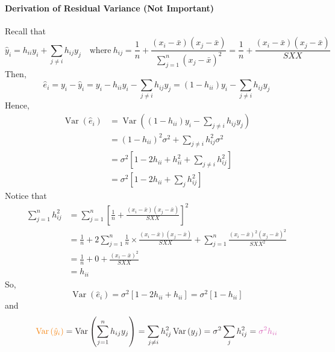 \documentclass[10pt]{article}
\begin{document}
\paragraph{Derivation of Residual Variance (Not Important)}
Recall that
\begin{equation*}
    \hat{y}_{i}=h_{i i} y_{i}+\sum_{j \neq i} h_{i j} y_{j} \quad \text{where}~h_{i j}=\frac{1}{n}+\frac{\left(x_{i}-\bar{x}\right)\left(x_{j}-\bar{x}\right)}{\sum_{j=1}^{n}\left(x_{j}-\bar{x}\right)^{2}}=\frac{1}{n}+\frac{\left(x_{i}-\bar{x}\right)\left(x_{j}-\bar{x}\right)}{S X X}
\end{equation*}
Then,
\begin{equation*}
    \hat{e}_{i}=y_{i}-\hat{y}_{i}=y_{i}-h_{i i} y_{i}-\sum_{j \neq i} h_{i j} y_{j}=\left(1-h_{i i}\right) y_{i}-\sum_{j \neq i} h_{i j} y_{j}
\end{equation*}
Hence,
\begin{align*}
    \operatorname{Var}\left(\hat{e}_{i}\right) &= \operatorname{Var}\left(\left(1-h_{i i}\right) y_{i}-\sum_{j \neq i} h_{i j} y_{j}\right) \\
    &= \left(1-h_{i i}\right)^{2} \sigma^{2}+\sum_{j \neq i} h_{i j}^{2} \sigma^{2} \\
    &= \sigma^{2}\left[1-2 h_{i i}+h_{i i}^{2}+\sum_{j \neq i} h_{i j}^{2}\right] \\
    &=\sigma^{2}\left[1-2 h_{i i}+\sum_{j} h_{i j}^{2}\right]
\end{align*}
Notice that 
\begin{align*} 
    \sum_{j=1}^{n} h_{i j}^{2} &=\sum_{j=1}^{n}\left[\frac{1}{n}+\frac{\left(x_{i}-\bar{x}\right)\left(x_{j}-\bar{x}\right)}{S X X}\right]^{2} \\ &=\frac{1}{n}+2 \sum_{j=1}^{n} \frac{1}{n} \times \frac{\left(x_{i}-\bar{x}\right)\left(x_{j}-\bar{x}\right)}{S X X}+\sum_{j=1}^{n} \frac{\left(x_{i}-\bar{x}\right)^{2}\left(x_{j}-\bar{x}\right)^{2}}{S X X^{2}} \\ &=\frac{1}{n}+0+\frac{\left(x_{i}-\bar{x}\right)^{2}}{S X X} \\ &=h_{i i} 
\end{align*}
So,
\begin{equation*}
    \operatorname{Var}\left(\hat{e}_{i}\right)=\sigma^{2}\left[1-2 h_{i i}+h_{i i}\right]=\sigma^{2}\left[1-h_{i i}\right]
\end{equation*}
and
\begin{equation*}
    \color{BurntOrange}{\operatorname{Var}\left(\hat{y}_{i}\right)} \color{Black}=\operatorname{Var}\left(\sum_{j=1}^{n} h_{i j} y_{j}\right)=\sum_{j \neq i} h_{i j}^{2} \operatorname{Var}\left(y_{j}\right)=\sigma^{2} \sum_{j} h_{i j}^{2}=\color{Thistle}{\sigma^{2} h_{i i}}
\end{equation*}
\end{document}
